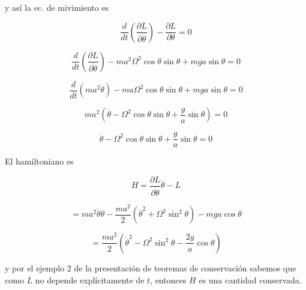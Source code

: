 \documentclass[12pt,a4paper]{article}
\begin{document}
\begin{enumerate}
        y así la ec. de mivimiento es
        
        \begin{equation*}
            \frac{d}{dt}\left(\frac{\partial L}{\partial \dot{\theta}}\right) - \frac{\partial L}{\partial \theta} = 0
        \end{equation*}
        
        \begin{equation*}
            \frac{d}{dt}\left(\frac{\partial L}{\partial \dot{\theta}}\right) - ma^2\Omega^2 \cos{\theta} \sin{\theta} + mga \sin{\theta} = 0
        \end{equation*}
        
        \begin{equation*}
            \frac{d}{dt}\left(ma^2 \dot{\theta}\right) - ma\Omega^2 \cos{\theta} \sin{\theta}  + mga \sin{\theta} = 0
        \end{equation*}
        
        \begin{equation*}
            ma^2 (\ddot{\theta} -  \Omega^2 \cos{\theta} \sin{\theta} + \frac{g}{a} \sin{\theta}) = 0
        \end{equation*}
        
        \begin{equation*}
            \ddot{\theta} -  \Omega^2 \cos{\theta} \sin{\theta} + \frac{g}{a} \sin{\theta} = 0
        \end{equation*}
        
        El hamiltoniano es
        
        \begin{equation*}
            H = \frac{\partial L}{\partial \dot{\theta}} \dot{\theta} - L
        \end{equation*}
        
        \begin{equation*}
             = ma^2 \dot{\theta} \dot{\theta} - \frac{ma^2}{2}(\dot{\theta}^2 + \Omega^2 \sin^2{\theta})   - mga \cos{\theta}
        \end{equation*}
        
        \begin{equation*}
            = \frac{ma^2}{2} \left( \dot{\theta}^2 - \Omega^2 \sin^2{\theta} - \frac{2g}{a}\cos{\theta} \right)
        \end{equation*}
        
        y por el ejemplo 2 de la presentación de teoremas de conservación sabemos que como $L$ no depende explícitamente de $t$, entonces $H$ es una cantidad conservada.
        

\end{enumerate}
\end{document}
